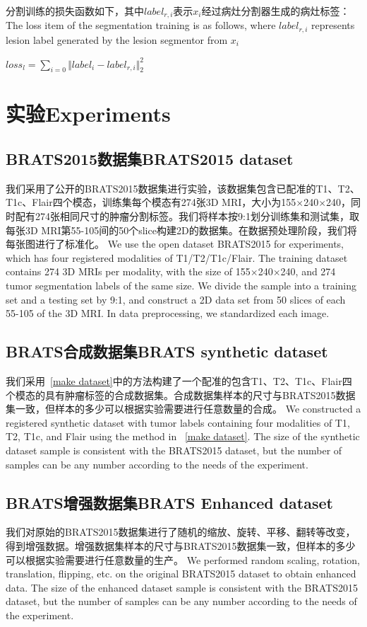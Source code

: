 \documentclass[letterpaper]{article} %
\begin{document}
分割训练的损失函数如下，其中$label_{r,i}$表示$x_i$经过病灶分割器生成的病灶标签：
The loss item of the segmentation training is as follows, where $label_{r,i}$ represents lesion label generated by the lesion segmentor from $x_i$
\begin{center}
		$loss_{l}=\sum\limits_{i=0}\Vert{label_i-label_{r,i}}\Vert_{2}^{2}$
\end{center}


\section{实验Experiments}

\subsection{BRATS2015数据集BRATS2015 dataset}
我们采用了公开的BRATS2015\cite{91menze:hal-00935640}数据集进行实验，该数据集包含已配准的T1、T2、T1c、Flair四个模态，训练集每个模态有274张3D MRI，大小为155$\times$240$\times$240，同时配有274张相同尺寸的肿瘤分割标签。我们将样本按9:1划分训练集和测试集，取每张3D MRI第55-105间的50个slice构建2D的数据集。在数据预处理阶段，我们将每张图进行了标准化。
We use the open dataset BRATS2015 for experiments, which has four registered modalities of T1/T2/T1c/Flair. The training dataset contains 274 3D MRIs per modality, with the size of 155$\times$240$\times$240, and 274 tumor segmentation labels of the same size. We divide the sample into a training set and a testing set by 9:1, and construct a 2D data set from 50 slices of each 55-105 of the 3D MRI. In data preprocessing, we standardized each image.

\subsection{BRATS合成数据集BRATS synthetic dataset}
我们采用~\ref{make dataset}中的方法构建了一个配准的包含T1、T2、T1c、Flair四个模态的具有肿瘤标签的合成数据集。合成数据集样本的尺寸与BRATS2015数据集一致，但样本的多少可以根据实验需要进行任意数量的合成。
We constructed a registered synthetic dataset with tumor labels containing four modalities of T1, T2, T1c, and Flair using the method in ~\ref{make dataset}. The size of the synthetic dataset sample is consistent with the BRATS2015 dataset, but the number of samples can be any number according to the needs of the experiment.

\subsection{BRATS增强数据集BRATS Enhanced dataset}
我们对原始的BRATS2015数据集进行了随机的缩放、旋转、平移、翻转等改变，得到增强数据。增强数据集样本的尺寸与BRATS2015数据集一致，但样本的多少可以根据实验需要进行任意数量的生产。
We performed random scaling, rotation, translation, flipping, etc. on the original BRATS2015 dataset to obtain enhanced data. The size of the enhanced dataset sample is consistent with the BRATS2015 dataset, but the number of samples can be any number according to the needs of the experiment.
\end{document}
